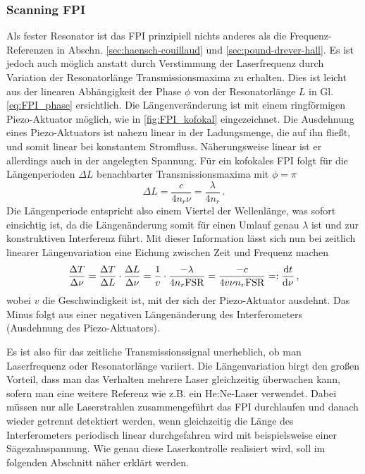 \subsubsection{Scanning FPI}\label{subsubsec:scanning_FPI}
Als fester Resonator ist das FPI prinzipiell nichts anderes als die
Frequenz-Referenzen in Abschn. \ref{sec:haensch-couillaud} und
\ref{sec:pound-drever-hall}. Es ist jedoch auch möglich anstatt durch
Verstimmung der Laserfrequenz durch Variation der Resonatorlänge
Transmissionsmaxima zu erhalten. Dies ist leicht aus der linearen Abhängigkeit
der Phase $\phi$ von der Resonatorlänge $L$ in Gl. \eqref{eq:FPI_phase}
ersichtlich. Die Längenveränderung ist mit einem ringförmigen Piezo-Aktuator
möglich, wie in \ref{fig:FPI_kofokal} eingezeichnet. Die Ausdehnung eines
Piezo-Aktuators ist nahezu linear in der Ladungsmenge, die auf ihn fließt, und
somit linear bei konstantem Stromfluss. Näherungsweise linear ist er allerdings
auch in der angelegten Spannung. Für ein kofokales FPI folgt für die Längenperioden $\Delta L$
benachbarter Transmissionsmaxima mit $\phi=\pi$
\begin{equation}\label{eq:FPI_laengenperiode}
	\Delta L=\frac{c}{4n_r\nu}=\frac{\lambda}{4n_r}\,.
\end{equation}
Die Längenperiode entspricht also einem Viertel der Wellenlänge, was sofort
einsichtig ist, da die Längenänderung somit für einen Umlauf genau $\lambda$ ist
und zur konstruktiven Interferenz führt. Mit dieser Information lässt sich nun
bei zeitlich linearer Längenvariation eine Eichung zwischen Zeit und Frequenz
machen
\begin{equation}\label{eq:FPI_zeit-eichung}
	\frac{\Delta T}{\Delta\nu}=\frac{\Delta T}{\Delta L}\cdot\frac{\Delta
	L}{\Delta\nu}=\frac{1}{v}\cdot\frac{-\lambda}{4n_r\text{FSR}}=\frac{-c}{4v\nu
	n_r\text{FSR}}=:\frac{\mathrm{d} t}{\mathrm{d} \nu}\,,
\end{equation}
wobei $v$ die Geschwindigkeit ist, mit der sich der Piezo-Aktuator ausdehnt.
Das Minus folgt aus einer negativen Längenänderung des Interferometers
(Ausdehnung des Piezo-Aktuators).\par
Es ist also für das zeitliche Transmissionssignal unerheblich, ob man
Laserfrequenz oder Resonatorlänge variiert. Die Längenvariation birgt den großen
Vorteil, dass man das Verhalten mehrere Laser gleichzeitig überwachen kann,
sofern man eine weitere Referenz wie z.B. ein He:Ne-Laser verwendet.
Dabei müssen nur alle Laserstrahlen zusammengeführt das FPI durchlaufen und danach
wieder getrennt detektiert werden, wenn gleichzeitig die Länge des
Interferometers periodisch linear durchgefahren wird mit beispielsweise einer
Sägezahnspannung. Wie genau diese Laserkontrolle realisiert wird, soll im
folgenden Abschnitt näher erklärt werden.

